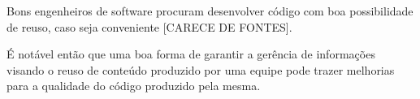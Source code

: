 Bons engenheiros de software procuram desenvolver código com boa possibilidade de reuso, caso seja conveniente [CARECE DE FONTES].

É notável então que uma boa forma de garantir a gerência de informações visando o reuso de conteúdo produzido por uma equipe pode trazer melhorias para a qualidade do código produzido pela mesma.

%






